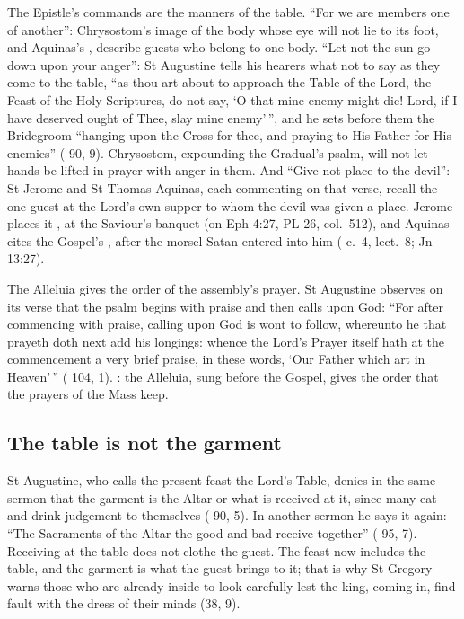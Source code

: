 The Epistle's commands are the manners of the table. ``For we are members one
of another'': Chrysostom's image of the body whose eye will not lie to its foot,
and Aquinas's , describe guests who
belong to one body. ``Let not the sun go down upon your anger'': St Augustine
tells his hearers what not to say as they come to the table, ``as thou art
about to approach the Table of the Lord, the Feast of the Holy Scriptures, do
not say, `O that mine enemy might die! Lord, if I have deserved ought of Thee,
slay mine enemy'\,'', and he sets before them the Bridegroom ``hanging upon the
Cross for thee, and praying to His Father for His enemies'' ( 90,
9). Chrysostom, expounding the Gradual's psalm, will not let hands be lifted in
prayer with anger in them. And ``Give not place to the
devil'': St Jerome and St Thomas Aquinas, each commenting on that verse,
recall the one guest at the Lord's own supper to whom the devil was given a
place. Jerome places it , at the Saviour's
banquet (on Eph 4:27, PL 26, col.~512), and Aquinas cites the Gospel's
, after the morsel Satan entered
into him ( c.~4, lect.~8; Jn 13:27).

The Alleluia gives the order of the assembly's prayer. St Augustine observes on
its verse that the psalm begins with praise and then calls upon God: ``For
after commencing with praise, calling upon God is wont to follow, whereunto he
that prayeth doth next add his longings: whence the Lord's Prayer itself hath
at the commencement a very brief praise, in these words, `Our Father which art
in Heaven'\,'' ( 104, 1). : the Alleluia, sung before the Gospel, gives the order that the
prayers of the Mass keep.

\subsection{The table is not the garment}

St Augustine, who calls the present feast the Lord's Table, denies in the same
sermon that the garment is the Altar or what is received at it, since many eat
and drink judgement to themselves ( 90, 5). In another sermon he
says it again: ``The Sacraments of the Altar the good and bad receive
together'' ( 95, 7). Receiving at the table does not clothe the
guest. The feast now includes the table, and the garment is what the guest
brings to it; that is why St Gregory warns those who are already inside to
look carefully lest the king, coming in, find fault with the dress of their
minds (38, 9).

